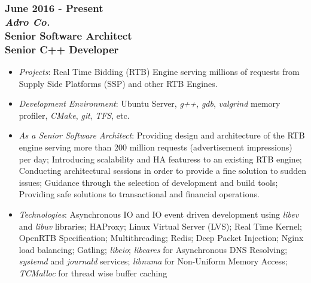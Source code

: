 \documentclass[10pt,a4paper]{article}
\begin{document}
\subsubsection{{June 2016 - Present} \\ \textnormal {\textit {Adro Co.}} \\ {Senior Software Architect \\ Senior C++ Developer}}
  \setlength{\leftskip}{0.5cm}
  \setlength{\rightskip}{1cm}
  \begin{itemize}
    \setlength{\rightskip}{1cm}
    \setlength\itemsep{0em}
    \item \small \textit {Projects}: Real Time Bidding (RTB) Engine serving millions of requests from Supply Side Platforms (SSP) and other RTB Engines.
    \item \small \textit {Development Environment}: Ubuntu Server, \textit{g++}, \textit{gdb}, \textit{valgrind} memory profiler, \textit{CMake}, \textit{git}, \textit{TFS}, etc.
    \item \small \textit {As a Senior Software Architect}: Providing design and architecture of the RTB engine serving more than 200 million requests (advertisement impressions) per day; Introducing scalability and HA featuress to an existing RTB engine; Conducting architectural sessions in order to provide a fine solution to sudden issues; Guidance through the selection of development and build tools; Providing safe solutions to transactional and financial operations.
    \item \small \textit {Technologies}: Asynchronous IO and IO event driven development using \textit{libev} and \textit{libuv} libraries; HAProxy; Linux Virtual Server (LVS); Real Time Kernel; OpenRTB Specification; Multithreading; Redis; Deep Packet Injection; Nginx load balancing; Gatling; \textit{libeio}; \textit{libcares} for Asynchronous DNS Resolving; \textit{systemd} and \textit{journald} services; \textit{libnuma} for Non-Uniform Memory Access; \textit{TCMalloc} for thread wise buffer caching 
  \end{itemize}
  \setlength{\leftskip}{0pt}
  \setlength{\rightskip}{0cm}
  
\end{document}
